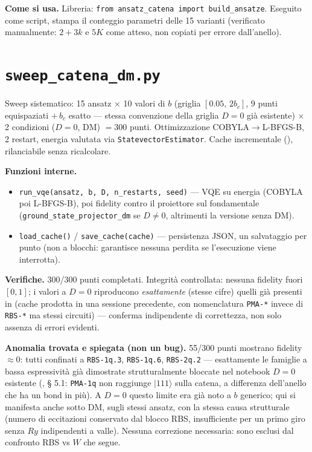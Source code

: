 \documentclass[11pt,a4paper]{article}
\begin{document}
\textbf{Come si usa.} Libreria: \texttt{from ansatz\_catena import build\_ansatze}.
Eseguito come script, stampa il conteggio parametri delle 15 varianti (verificato
manualmente: $2+3k$ e $5K$ come atteso, non copiati per errore dall'anello).

\section*{\texttt{sweep\_catena\_dm.py}}

Sweep sistematico: 15 ansatz $\times$ 10 valori di $b$ (griglia
$[0.05,\,2b_c]$, 9 punti equispaziati $+\,b_c$ esatto — stessa convenzione della
griglia $D=0$ già esistente) $\times$ 2 condizioni ($D=0$, DM) $=300$ punti.
Ottimizzazione COBYLA$\to$L-BFGS-B, 2 restart, energia valutata via
\texttt{StatevectorEstimator}. Cache incrementale
(\texttt{}), rilanciabile senza
ricalcolare.

\textbf{Funzioni interne.}
\begin{itemize}
\item \texttt{run\_vqe(ansatz,\ b,\ D,\ n\_restarts,\ seed)} — VQE su energia
(COBYLA poi L-BFGS-B), poi fidelity contro il proiettore sul fondamentale
(\texttt{ground\_state\_projector\_dm} se $D\neq0$, altrimenti la versione senza DM).
\item \texttt{load\_cache()} / \texttt{save\_cache(cache)} — persistenza JSON, un
salvataggio per punto (non a blocchi: garantisce nessuna perdita se l'esecuzione
viene interrotta).
\end{itemize}

\textbf{Verifiche.} 300/300 punti completati. Integrità controllata: nessuna
fidelity fuori $[0,1]$; i valori a $D=0$ riproducono \emph{esattamente} (stesse
cifre) quelli già presenti in \texttt{}
(cache prodotta in una sessione precedente, con nomenclatura \texttt{PMA-*} invece di
\texttt{RBS-*} ma stessi circuiti) — conferma indipendente di correttezza, non solo
assenza di errori evidenti.

\textbf{Anomalia trovata e spiegata (non un bug).} 55/300 punti mostrano fidelity
$\approx0$: tutti confinati a \texttt{RBS-1q.3}, \texttt{RBS-1q.6},
\texttt{RBS-2q.2} — esattamente le famiglie a bassa espressività già dimostrate
strutturalmente bloccate nel notebook $D=0$ esistente
(\texttt{}, § 5.1:
\texttt{PMA-1q} non raggiunge $\lvert111\rangle$ sulla catena, a differenza dell'anello che
ha un bond in più). A $D=0$ questo limite era già noto a $b$ generico; qui si
manifesta anche sotto DM, sugli stessi ansatz, con la stessa causa strutturale
(numero di eccitazioni conservato dal blocco RBS, insufficiente per un primo giro
senza $Ry$ indipendenti a valle). Nessuna correzione necessaria: sono esclusi dal
confronto RBS vs $W$ che segue.
\end{document}
